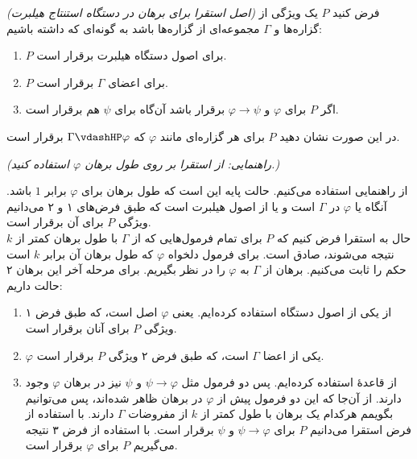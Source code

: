 \emph{(اصل استقرا برای برهان در دستگاه استنتاج هیلبرت) }
	فرض کنید $P$ یک ویژگی از گزاره‌ها و $\Gamma$ مجموعه‌ای از گزاره‌ها باشد به گونه‌ای که داشته باشیم:
	\begin{enumerate}
		\item $P$ برای اصول دستگاه هیلبرت برقرار است.
		\item $P$ برای اعضای $\Gamma$ برقرار است.
		\item اگر $P$ برای $\varphi$ و $\varphi \rightarrow \psi$ برقرار باشد آن‌گاه برای $\psi$ هم برقرار است.
	\end{enumerate}
	در این صورت نشان دهید $P$ برای هر گزاره‌ای مانند $\varphi$ که $\Gamma \vdashHP \varphi$ برقرار است.
	
	\emph{(راهنمایی: از استقرا بر روی طول برهان $\varphi$ استفاده کنید.)}
	
	\quad\vspace {0.5cm}
	\begin{ans}
		از راهنمایی استفاده می‌کنیم. حالت پایه این است که طول برهان برای 
		$\varphi$
		برابر $1$ باشد.
		آنگاه یا 
		$\varphi$
		در 
		$\Gamma$
		است و یا از اصول هیلبرت است که طبق فرض‌های ۱ و ۲ می‌دانیم ویژگی $P$ برای آن برقرار است.\\
		حال به استقرا فرض کنیم که $P$ برای تمام فرمول‌هایی که از 
		$\Gamma$
		با طول برهان کمتر از $k$ نتیجه می‌شوند، صادق است. برای فرمول دلخواه 
		$\varphi$
		که طول برهان آن برابر $k$ است حکم را ثابت می‌کنیم.
		برهان از 
		$\Gamma$
		 به 
		$\varphi$
		را در نظر بگیریم. برای مرحله آخر این برهان ۲ حالت داریم:
		\quad\vspace{0.5cm}
		\begin{enumerate}
			\item از یکی از اصول دستگاه استفاده کرده‌ایم. یعنی $\varphi$ اصل است، که طبق فرض ۱ ویژگی $P$ برای آنان برقرار است.
			\item $\varphi$ یکی از اعضا 
			$\Gamma$
			است، که طبق فرض ۲ ویژگی $P$ برقرار است. 
			\item از قاعدهٔ 
			استفاده کرده‌ایم. پس دو فرمول مثل $\psi \rightarrow \varphi$ و $\psi$ نیز در برهان $\varphi$ وجود دارند.
			از آن‌جا که این دو فرمول پیش از $\varphi$ در برهان ظاهر شده‌اند، پس می‌توانیم بگویمم هرکدام یک برهان با طول کمتر از $k$ از مفروضات $\Gamma$ دارند. با استفاده از فرض استقرا می‌دانیم $P$ برای $\psi \rightarrow \varphi$ و $\psi$ برقرار است. با استفاده از فرض ۳ نتیجه می‌گیریم $P$ برای $\varphi$ برقرار است.
		\end{enumerate}
	\end{ans}	
